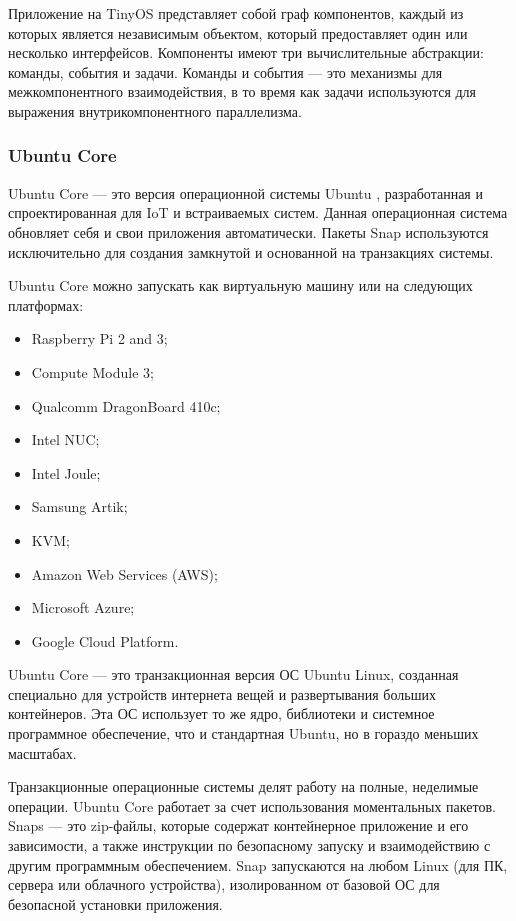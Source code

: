 Приложение на TinyOS представляет собой граф компонентов, каждый из которых является независимым объектом, который предоставляет один или несколько интерфейсов. Компоненты имеют три вычислительные абстракции: команды, события и задачи. Команды и события --- это механизмы для межкомпонентного взаимодействия, в то время как задачи используются для выражения внутрикомпонентного параллелизма.





\subsubsection{Ubuntu Core}

Ubuntu Core \cite{Ubuntu_Core_doc} --- это версия операционной системы Ubuntu \cite{Ubuntu_Desktop}, разработанная и спроектированная для IoT и встраиваемых систем. Данная операционная система обновляет себя и свои приложения автоматически. Пакеты Snap используются исключительно для создания замкнутой и основанной на транзакциях системы.

Ubuntu Core можно запускать как виртуальную машину или на следующих платформах:

\begin{itemize}[label*=---]
	\item Raspberry Pi 2 and 3;
	\item Compute Module 3;
	\item Qualcomm DragonBoard 410c;
	\item Intel NUC;
	\item Intel Joule;
	\item Samsung Artik;
	\item KVM;
	\item Amazon Web Services (AWS);
	\item Microsoft Azure;
	\item Google Cloud Platform.
\end{itemize}

Ubuntu Core \cite{Ubuntu_Core_def} --- это транзакционная версия ОС Ubuntu Linux, созданная специально для устройств интернета вещей и развертывания больших контейнеров. Эта ОС использует то же ядро, библиотеки и системное программное обеспечение, что и стандартная Ubuntu, но в гораздо меньших масштабах.

Транзакционные операционные системы делят работу на полные, неделимые операции. Ubuntu Core работает за счет использования моментальных пакетов. Snaps --- это zip-файлы, которые содержат контейнерное приложение и его зависимости, а также инструкции по безопасному запуску и взаимодействию с другим программным обеспечением. Snap запускаются на любом Linux (для ПК, сервера или облачного устройства), изолированном от базовой ОС для безопасной установки приложения.

